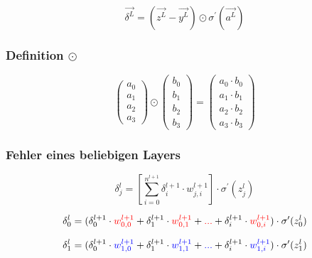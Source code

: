 \documentclass{article}
\begin{document}
\[ \vec{\delta^L} = (\vec{z^L} - \vec{y^L}) \odot \sigma^{\prime}(\vec{a^L}) \]


\subsubsection{Definition $\odot$}
\[ \left(\begin{array}{c}
    a_0 \\ a_1 \\ a_2 \\ a_3
\end{array}\right)
\odot \left(\begin{array}{c}
    b_0 \\ b_1 \\ b_2 \\ b_3
\end{array}\right) 
= \left(\begin{array}{c}
    a_0 \cdot b_0 \\ a_1 \cdot b_1 \\ a_2 \cdot b_2 \\ a_3 \cdot b_3
\end{array}\right) \]

\pagebreak
\subsubsection{Fehler eines beliebigen Layers}
\[ \delta_j^{l} = [\sum_{i = 0}^{n^{l+1}} \delta_i^{l+1} \cdot w_{j,i}^{l+1}] \cdot \sigma^{\prime}(z_j^{l})  \]

\[ \delta_0^l = (\delta_0^{l+1} \cdot \textcolor{red}{w_{0,0}^{l+1}} + \delta_1^{l+1} \cdot \textcolor{red}{w_{0,1}^{l+1}}
 + \textcolor{red}{...} + \delta_i^{l+1} \cdot \textcolor{red}{w_{0,i}^{l+1}}) \cdot \sigma^{\prime}(z_0^{l}) \]

 \[ \delta_1^l = (\delta_0^{l+1} \cdot \textcolor{blue}{w_{1,0}^{l+1}} + \delta_1^{l+1} \cdot \textcolor{blue}{w_{1,1}^{l+1}}
 + \textcolor{blue}{...} + \delta_i^{l+1} \cdot \textcolor{blue}{w_{1,i}^{l+1}}) \cdot \sigma^{\prime}(z_1^{l}) \]
\end{document}
